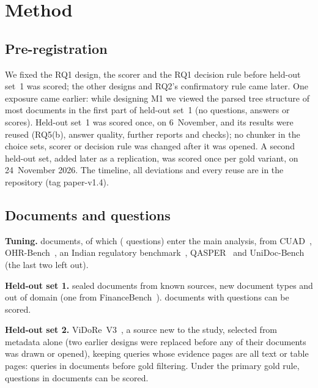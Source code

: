 \section{Method}\label{sec:method}

\subsection{Pre-registration}\label{sec:prereg}

We fixed the RQ1 design, the scorer and the RQ1 decision rule before held-out
set~1 was scored; the other designs and RQ2's confirmatory rule came later. One exposure came earlier: while designing M1 we viewed the
parsed tree structure of most documents in the first part of held-out set~1 (no
questions, answers or scores). Held-out set~1 was scored once, on 6~November,
and its results were reused (RQ5(b), answer quality, further reports and
checks); no chunker in the choice sets, scorer or decision rule was changed after
it was opened. A second held-out set, added later as a replication, was scored
once per gold variant, on 24~November 2026. The timeline, all deviations and every reuse are in
the repository (tag paper-v1.4).

\subsection{Documents and questions}\label{sec:docs}

\textbf{Tuning.} \TuningDocuments{} documents, of which \TuningMainDocuments{}
(\TuningMainQuestions{} questions) enter the main analysis, from
CUAD~\cite{hendrycks2021cuad}, OHR-Bench~\cite{zhang2024ocr}, an Indian
regulatory benchmark~\cite{singh2026parser}, QASPER~\cite{dasigi2021qasper} and
UniDoc-Bench~\cite{peng2025unidoc} (the last two left out).

\textbf{Held-out set 1.} \AccountingHeldOut{} sealed documents from known
sources, new document types and out of domain (one from
FinanceBench~\cite{islam2023financebench}). \AccountingMain{} documents with
\RQoneQuestions{} questions can be scored.

\textbf{Held-out set 2.} ViDoRe~V3~\cite{loison2026vidore}, a source new to the study,
selected from metadata alone (two earlier designs were replaced before any of their
documents was drawn or opened), keeping queries whose evidence pages are all text
or table pages: \HTwoQueries{} queries in \HTwoSelectedDocuments{} documents before
gold filtering. Under the primary gold rule, \RQoneHTwoDropRuleQuestions{}
questions in \RQoneHTwoDropRuleDocuments{} documents can be scored. 


